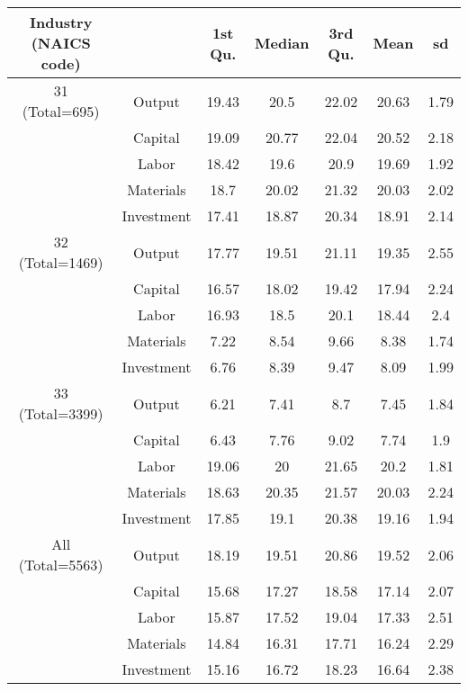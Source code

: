 \begin{table}[H]
\centering
\begin{tabular}{ccccccc}
  \hline\hline Industry (NAICS code) &   & 1st Qu. & Median & 3rd Qu. & Mean & sd \\ 
  \hline
31 (Total=695) & Output & 19.43 & 20.5 & 22.02 & 20.63 & 1.79 \\ 
   & Capital & 19.09 & 20.77 & 22.04 & 20.52 & 2.18 \\ 
   & Labor & 18.42 & 19.6 & 20.9 & 19.69 & 1.92 \\ 
   & Materials & 18.7 & 20.02 & 21.32 & 20.03 & 2.02 \\ 
   & Investment & 17.41 & 18.87 & 20.34 & 18.91 & 2.14 \\ 
  32 (Total=1469) & Output & 17.77 & 19.51 & 21.11 & 19.35 & 2.55 \\ 
   & Capital & 16.57 & 18.02 & 19.42 & 17.94 & 2.24 \\ 
   & Labor & 16.93 & 18.5 & 20.1 & 18.44 & 2.4 \\ 
   & Materials & 7.22 & 8.54 & 9.66 & 8.38 & 1.74 \\ 
   & Investment & 6.76 & 8.39 & 9.47 & 8.09 & 1.99 \\ 
  33 (Total=3399) & Output & 6.21 & 7.41 & 8.7 & 7.45 & 1.84 \\ 
   & Capital & 6.43 & 7.76 & 9.02 & 7.74 & 1.9 \\ 
   & Labor & 19.06 & 20 & 21.65 & 20.2 & 1.81 \\ 
   & Materials & 18.63 & 20.35 & 21.57 & 20.03 & 2.24 \\ 
   & Investment & 17.85 & 19.1 & 20.38 & 19.16 & 1.94 \\ 
  All (Total=5563) & Output & 18.19 & 19.51 & 20.86 & 19.52 & 2.06 \\ 
   & Capital & 15.68 & 17.27 & 18.58 & 17.14 & 2.07 \\ 
   & Labor & 15.87 & 17.52 & 19.04 & 17.33 & 2.51 \\ 
   & Materials & 14.84 & 16.31 & 17.71 & 16.24 & 2.29 \\ 
   & Investment & 15.16 & 16.72 & 18.23 & 16.64 & 2.38 \\ 
   \hline
\end{tabular}
\end{table}
